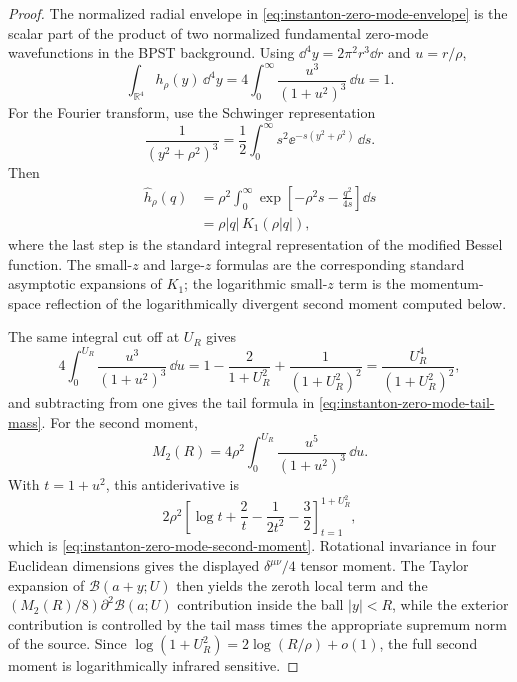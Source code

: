 \begin{proof}
The normalized radial envelope in \eqref{eq:instanton-zero-mode-envelope} is
the scalar part of the product of two normalized fundamental zero-mode
wavefunctions in the BPST background.  Using
\(\dd^4y=2\pi^2r^3\dd r\) and \(u=r/\rho\),
\[
  \int_{\mathbb R^4}h_\rho(y)\,\dd^4y
  =
  4\int_0^\infty\frac{u^3}{(1+u^2)^3}\,\dd u
  =
  1.
\]
For the Fourier transform, use the Schwinger representation
\[
  \frac1{(y^2+\rho^2)^3}
  =
  \frac12\int_0^\infty s^2\ee^{-s(y^2+\rho^2)}\,\dd s .
\]
Then
\[
\begin{aligned}
  \widehat h_\rho(q)
  &=
  \rho^2\int_0^\infty
  \exp\!\left[-\rho^2s-\frac{q^2}{4s}\right]\dd s  \\
  &=
  \rho |q|\,K_1(\rho |q|),
\end{aligned}
\]
where the last step is the standard integral representation of the modified
Bessel function.  The small-\(z\) and large-\(z\) formulas are the
corresponding standard asymptotic expansions of \(K_1\); the logarithmic
small-\(z\) term is the momentum-space reflection of the logarithmically
divergent second moment computed below.

The same integral cut off at \(U_R\) gives
\[
  4\int_0^{U_R}\frac{u^3}{(1+u^2)^3}\,\dd u
  =
  1-\frac{2}{1+U_R^2}
  +\frac{1}{(1+U_R^2)^2}
  =
  \frac{U_R^4}{(1+U_R^2)^2},
\]
and subtracting from one gives the tail formula in
\eqref{eq:instanton-zero-mode-tail-mass}.  For the second moment,
\[
  M_2(R)
  =
  4\rho^2\int_0^{U_R}\frac{u^5}{(1+u^2)^3}\,\dd u .
\]
With \(t=1+u^2\), this antiderivative is
\[
  2\rho^2
  \left[
    \log t+\frac2t-\frac{1}{2t^2}-\frac32
  \right]_{t=1}^{1+U_R^2},
\]
which is \eqref{eq:instanton-zero-mode-second-moment}.  Rotational
invariance in four Euclidean dimensions gives the displayed
\(\delta^{\mu\nu}/4\) tensor moment.  The Taylor expansion of
\(\mathcal B(a+y;U)\) then yields the zeroth local term and the
\((M_2(R)/8)\partial^2\mathcal B(a;U)\) contribution inside the ball
\(|y|<R\), while the exterior contribution is controlled by the tail mass
times the appropriate supremum norm of the source.  Since
\(\log(1+U_R^2)=2\log(R/\rho)+o(1)\), the full second moment is
logarithmically infrared sensitive.
\end{proof}

